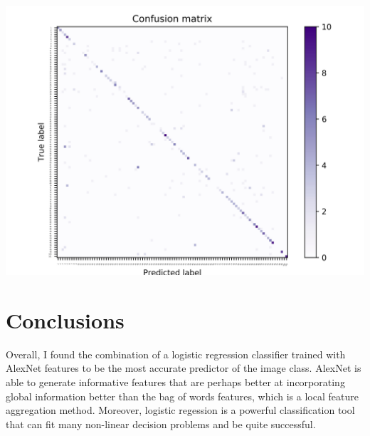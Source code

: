 \documentclass[]{article}
\begin{document}
\includegraphics[scale=0.10]{alex_net_logistic_confusion_results.jpg}

\section{Conclusions}
Overall, I found the combination of a logistic regression classifier trained with AlexNet features to be the most accurate predictor of the image class. AlexNet is able to generate informative features that are perhaps better at incorporating global information better than the bag of words features, which is a local feature aggregation method. Moreover, logistic regession is a powerful classification tool that can fit many non-linear decision problems and be quite successful.
\end{document}
